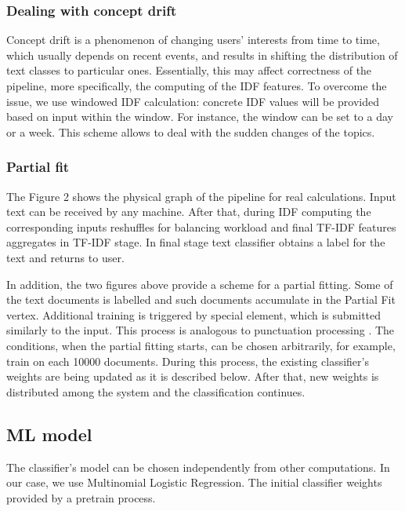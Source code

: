 \subsubsection{Dealing with concept drift}

Concept drift is a phenomenon of changing users' interests from time to time, which usually depends on recent events, and results in shifting the distribution of text classes to particular ones. Essentially, this may affect correctness of the pipeline, more specifically, the computing of the IDF features. To overcome the issue, we use windowed IDF calculation: concrete IDF values will be provided based on input within the window. For instance, the window can be set to a day or a week. This scheme allows to deal with the sudden changes of the topics.

\subsubsection{Partial fit}

The Figure 2 shows the physical graph of the pipeline for real calculations. Input text can be received by any machine. After that, during IDF computing the corresponding inputs reshuffles for balancing workload and final TF-IDF features aggregates in TF-IDF stage. In final stage text classifier obtains a label for the text and returns to user.

In addition, the two figures above provide a scheme for a partial fitting. Some of the text documents is labelled and such documents accumulate in the Partial Fit vertex. Additional training is triggered by special element, which is submitted similarly to the input. This process is analogous to punctuation processing \cite{tucker2003exploiting}. The conditions, when the partial fitting starts, can be chosen arbitrarily, for example, train on each 10000 documents. During this process, the existing classifier's weights are being updated as it is described below. After that, new weights is distributed among the system and the classification continues. 

\subsection{ML model}

The classifier's model can be chosen independently from other computations. In our case, we use Multinomial Logistic Regression. The initial classifier weights provided by a pretrain process. 

